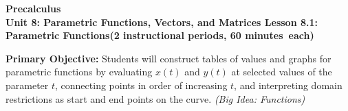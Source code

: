 \documentclass[10pt]{article}
\newcommand{\CourseName}{Precalculus}
\newcommand{\MeetingLength}{60 minutes}
\newcommand{\UnitNumberName}{Unit 8: Parametric Functions, Vectors, and Matrices \quad}
\newcommand{\LessonNumberName}{Lesson 8.1: Parametric Functions}
\begin{document}
\begin{center}
  {\Large\bfseries \CourseName} \\[4pt]
  {\small\bfseries \UnitNumberName \LessonNumberName \quad (2 instructional periods, \MeetingLength\ each)}
\end{center}

\begin{tcolorbox}[colback=sky, colframe=navy, boxrule=0.9pt, arc=2mm,
    left=2mm, right=2mm, top=1.5mm, bottom=1.5mm]
  \textbf{Primary Objective:} Students will construct tables of values and
  graphs for parametric functions by evaluating $x(t)$ and $y(t)$ at selected
  values of the parameter $t$, connecting points in order of increasing $t$,
  and interpreting domain restrictions as start and end points on the curve.
  \textit{(Big Idea: Functions)}
\end{tcolorbox}

\vspace{0.08in}
\end{document}
